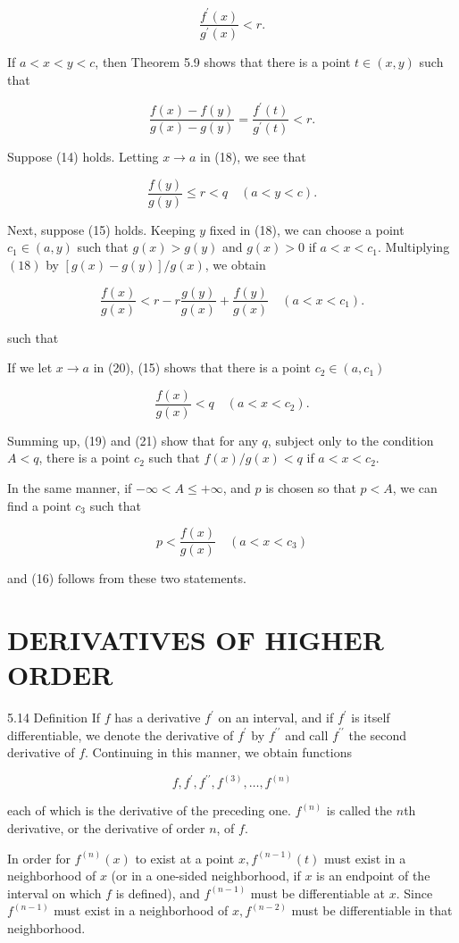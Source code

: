 \documentclass[10pt]{article}
\begin{document}
$$
\frac{f^{\prime}(x)}{g^{\prime}(x)}<r .
$$

If $a<x<y<c$, then Theorem 5.9 shows that there is a point $t \in(x, y)$ such that

$$
\frac{f(x)-f(y)}{g(x)-g(y)}=\frac{f^{\prime}(t)}{g^{\prime}(t)}<r .
$$

Suppose (14) holds. Letting $x \rightarrow a$ in (18), we see that

$$
\frac{f(y)}{g(y)} \leq r<q \quad(a<y<c) .
$$

Next, suppose (15) holds. Keeping $y$ fixed in (18), we can choose a point $c_{1} \in(a, y)$ such that $g(x)>g(y)$ and $g(x)>0$ if $a<x<c_{1}$. Multiplying $(18)$ by $[g(x)-g(y)] / g(x)$, we obtain

$$
\frac{f(x)}{g(x)}<r-r \frac{g(y)}{g(x)}+\frac{f(y)}{g(x)} \quad\left(a<x<c_{1}\right) .
$$

such that

If we let $x \rightarrow a$ in (20), (15) shows that there is a point $c_{2} \in\left(a, c_{1}\right)$

$$
\frac{f(x)}{g(x)}<q \quad\left(a<x<c_{2}\right) .
$$

Summing up, (19) and (21) show that for any $q$, subject only to the condition $A<q$, there is a point $c_{2}$ such that $f(x) / g(x)<q$ if $a<x<c_{2}$.

In the same manner, if $-\infty<A \leq+\infty$, and $p$ is chosen so that $p<A$, we can find a point $c_{3}$ such that

$$
p<\frac{f(x)}{g(x)} \quad\left(a<x<c_{3}\right)
$$

and (16) follows from these two statements.

\section{DERIVATIVES OF HIGHER ORDER}
5.14 Definition If $f$ has a derivative $f^{\prime}$ on an interval, and if $f^{\prime}$ is itself differentiable, we denote the derivative of $f^{\prime}$ by $f^{\prime \prime}$ and call $f^{\prime \prime}$ the second derivative of $f$. Continuing in this manner, we obtain functions

$$
f, f^{\prime}, f^{\prime \prime}, f^{(3)}, \ldots, f^{(n)}
$$

each of which is the derivative of the preceding one. $f^{(n)}$ is called the $n$th derivative, or the derivative of order $n$, of $f$.

In order for $f^{(n)}(x)$ to exist at a point $x, f^{(n-1)}(t)$ must exist in a neighborhood of $x$ (or in a one-sided neighborhood, if $x$ is an endpoint of the interval on which $f$ is defined), and $f^{(n-1)}$ must be differentiable at $x$. Since $f^{(n-1)}$ must exist in a neighborhood of $x, f^{(n-2)}$ must be differentiable in that neighborhood.
\end{document}
